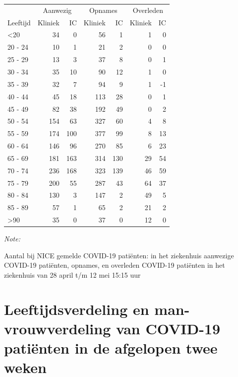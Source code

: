 \documentclass[
  english,
  man,floatsintext]{apa6}
\begin{document}
\begin{table}
\centering\begingroup\fontsize{10}{12}\selectfont

\begin{threeparttable}
\begin{tabular}{lrrrrrr}
\toprule
\multicolumn{1}{c}{ } & \multicolumn{2}{c}{Aanwezig} & \multicolumn{2}{c}{Opnames} & \multicolumn{2}{c}{Overleden} \\
\cmidrule(l{3pt}r{3pt}){2-3} \cmidrule(l{3pt}r{3pt}){4-5} \cmidrule(l{3pt}r{3pt}){6-7}
Leeftijd & Kliniek & IC & Kliniek & IC & Kliniek & IC\\
\midrule
<20 & 34 & 0 & 56 & 1 & 1 & 0\\
20 - 24 & 10 & 1 & 21 & 2 & 0 & 0\\
25 - 29 & 13 & 3 & 37 & 8 & 0 & 1\\
30 - 34 & 35 & 10 & 90 & 12 & 1 & 0\\
35 - 39 & 32 & 7 & 94 & 9 & 1 & -1\\
40 - 44 & 45 & 18 & 113 & 28 & 0 & 1\\
45 - 49 & 82 & 38 & 192 & 49 & 0 & 2\\
50 - 54 & 154 & 63 & 327 & 60 & 4 & 8\\
55 - 59 & 174 & 100 & 377 & 99 & 8 & 13\\
60 - 64 & 146 & 96 & 270 & 85 & 6 & 23\\
65 - 69 & 181 & 163 & 314 & 130 & 29 & 54\\
70 - 74 & 236 & 168 & 323 & 139 & 46 & 59\\
75 - 79 & 200 & 55 & 287 & 43 & 64 & 37\\
80 - 84 & 130 & 3 & 147 & 2 & 49 & 5\\
85 - 89 & 57 & 1 & 65 & 2 & 21 & 2\\
>90 & 35 & 0 & 37 & 0 & 12 & 0\\
\bottomrule
\end{tabular}
\begin{tablenotes}
\item \textit{Note: } 
\item Aantal bij NICE gemelde COVID-19 patiënten: in het ziekenhuis aanwezige COVID-19 patiënten, opnames, en overleden COVID-19 patiënten in het ziekenhuis van 28 april t/m 12 mei 15:15 uur
\end{tablenotes}
\end{threeparttable}
\endgroup{}
\end{table}

\newpage

\hypertarget{leeftijdsverdeling-en-man-vrouwverdeling-van-covid-19-patiuxebnten-in-de-afgelopen-twee-weken}{%
\section{Leeftijdsverdeling en man-vrouwverdeling van COVID-19 patiënten in de afgelopen twee weken}\label{leeftijdsverdeling-en-man-vrouwverdeling-van-covid-19-patiuxebnten-in-de-afgelopen-twee-weken}}
\end{document}
